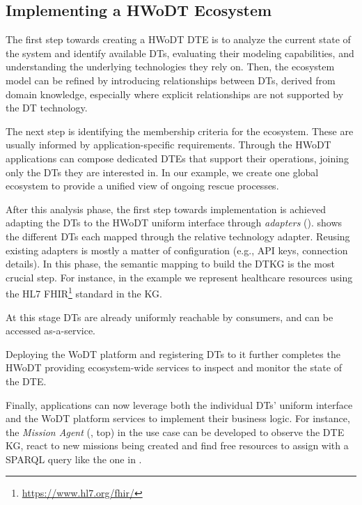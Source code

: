 \subsection{Implementing a \acs{HWoDT} Ecosystem}

The first step towards creating a \ac{HWoDT} \ac{DTE} is to analyze the current state of the system and identify available \acp{DT}, evaluating their modeling capabilities, and understanding the underlying technologies they rely on.
%
Then, the ecosystem model can be refined by introducing relationships between \acp{DT}, derived from domain knowledge, especially where explicit relationships are not supported by the \ac{DT} technology.

The next step is identifying the membership criteria for the ecosystem. These are usually informed by application-specific requirements. 
%
Through the \ac{HWoDT} applications can compose dedicated \acp{DTE} that support their operations, joining only the \acp{DT} they are interested in.
%
In our example, we create one global ecosystem to provide a unified view of ongoing rescue processes.

After this analysis phase, the first step towards implementation is achieved adapting the \acp{DT} to the \ac{HWoDT} uniform interface through \emph{adapters} ().
 shows the different \acp{DT} each mapped through the relative technology adapter. 
%
Reusing existing adapters is mostly a matter of configuration (e.g., API keys, connection details). 
In this phase, the semantic mapping to build the \ac{DTKG} is the most crucial step. 
For instance, in the example we represent healthcare resources using the HL7 FHIR\footnote{\url{https://www.hl7.org/fhir/}} standard in the \ac{KG}.

At this stage \acp{DT} are already uniformly reachable by consumers, and can be accessed as-a-service.

Deploying the \ac{WoDT} platform and registering \acp{DT} to it further completes the \ac{HWoDT} providing ecosystem-wide services to inspect and monitor the state of the \ac{DTE}.

Finally, applications can now leverage both the individual \acp{DT}' uniform interface and the \ac{WoDT} platform services to implement their business logic.
For instance, the \emph{Mission Agent} (, top) in the use case can be developed to observe the \ac{DTE} \ac{KG}, react to new missions being created and find free resources to assign with a SPARQL query like the one in .

